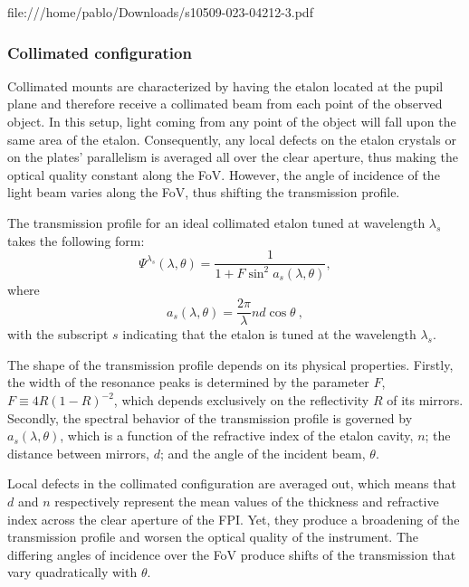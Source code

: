 file:///home/pablo/Downloads/s10509-023-04212-3.pdf

\subsubsection{\label{eta_corr_susec: collimated}Collimated configuration}

Collimated mounts are characterized by having the etalon located at the pupil plane and therefore receive a collimated beam from each point of the observed object. In this setup, light coming from any point of the object will fall upon the same area of the etalon. Consequently, any local defects on the etalon crystals or on the plates' parallelism is averaged all over the clear aperture, thus making the optical quality constant along the FoV. However, the angle of incidence of the light beam varies along the FoV, thus shifting the transmission profile.  

 The transmission profile for an ideal collimated etalon tuned at wavelength $\lambda _ s$ takes the following form:
\begin{equation}
\Psi ^{\lambda _ s} (\lambda, \theta) = \frac{1}{1 + F \sin ^2 a_s (\lambda,\theta) },
\end{equation}
where
\begin{equation}
a_s (\lambda, \theta) =\frac{2  \pi}{\lambda} nd\cos \theta  \ ,
\label{eq_eta_corr: a-def}
\end{equation}
with the subscript $s$ indicating that the etalon is tuned at the wavelength $\lambda_s$.

The shape of the transmission profile depends on its physical properties. Firstly, the width of the resonance peaks is determined by the parameter $F$, $F \equiv 4R (1 - R )^{-2}$, which depends exclusively on the reflectivity $R$ of its mirrors. Secondly, the spectral behavior of the transmission profile is governed by $a_s(\lambda,\theta)$, which is a function of the refractive index of the etalon cavity, $n$; the distance between mirrors, $d$; and the angle of the incident beam, $\theta$. 

Local defects in the collimated configuration are averaged out, which means that $d$ and $n$ respectively represent the mean values of the thickness and refractive index across the clear aperture of the FPI. Yet, they produce a broadening of the transmission profile and worsen the optical quality of the instrument. The differing angles of incidence over the FoV produce shifts of the transmission that vary quadratically with $\theta$.

